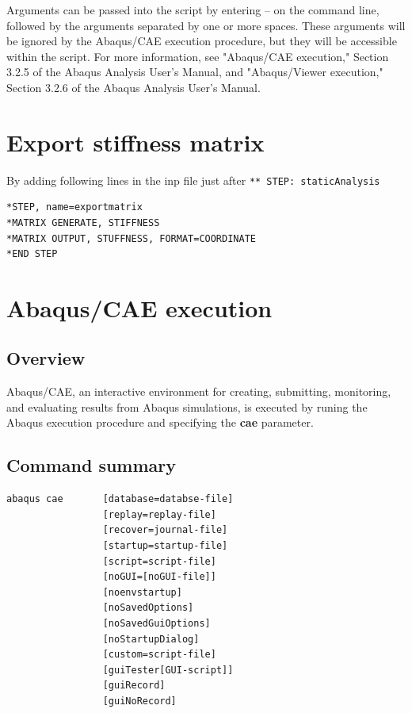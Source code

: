 \documentclass[10pt,a4paper]{article}
\begin{document}
Arguments can be passed into the script by entering -- on the command line, followed by the arguments separated by one or more spaces. These arguments will be ignored by the Abaqus/CAE execution procedure, but they will be accessible within the script. For more information, see "Abaqus/CAE execution," Section 3.2.5 of the Abaqus Analysis User's Manual, and "Abaqus/Viewer execution," Section 3.2.6 of the Abaqus Analysis User's Manual.

\section{Export stiffness matrix}
By adding following lines in the inp file  just after \lstinline|** STEP: staticAnalysis|
\begin{lstlisting}
*STEP, name=exportmatrix
*MATRIX GENERATE, STIFFNESS
*MATRIX OUTPUT, STUFFNESS, FORMAT=COORDINATE
*END STEP
\end{lstlisting}
\section{Abaqus/CAE execution}
\subsection{Overview}
Abaqus/CAE, an interactive environment for creating, submitting, monitoring, and evaluating results from Abaqus simulations, is executed by runing the Abaqus execution procedure and specifying the \textbf{cae} parameter.

\subsection{Command summary}
\begin{lstlisting}[language=command.com]
abaqus cae       [database=databse-file]
                 [replay=replay-file]
                 [recover=journal-file]
                 [startup=startup-file]
                 [script=script-file]
                 [noGUI=[noGUI-file]]
                 [noenvstartup]
                 [noSavedOptions]
                 [noSavedGuiOptions]
                 [noStartupDialog]
                 [custom=script-file]
                 [guiTester[GUI-script]]
                 [guiRecord]
                 [guiNoRecord]
\end{lstlisting}
\end{document}
